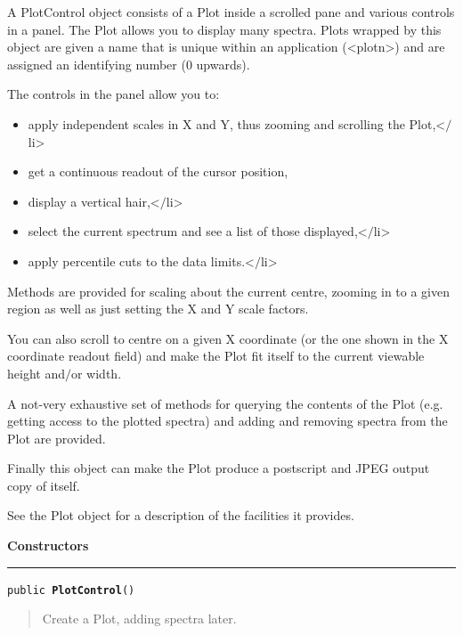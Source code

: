 \documentclass[twoside,11pt]{article}
\renewcommand{\_}{\texttt{\symbol{95}}}
\newcommand{\method}[1]{\texttt{#1}}
\newenvironment{desc}{\begin{quote}}{\end{quote}}
\newcommand{\constructors}{
   \par\textbf{\large{Constructors}}\\
   \hrule
}
\begin{document}





{A PlotControl object consists of a Plot inside a scrolled pane and
 various controls in a panel. The Plot allows you to display many
 spectra. Plots wrapped by this object are given a name that is
 unique within an application (\textless plotn\textgreater ) and are assigned an
 identifying number (0 upwards).

 The controls in the panel allow you to:
 \begin{itemize}
 \item{ apply independent scales in X and Y, thus zooming and
        scrolling the Plot,\textless $/$li\textgreater
 }
   \item{  get a continuous readout of the cursor position,
   }
\item{  display a vertical hair,\textless $/$li\textgreater
   }
\item{  select the current spectrum and see a list of those
        displayed,\textless $/$li\textgreater
   }
\item{  apply percentile cuts to the data limits.\textless $/$li\textgreater
 }
\end{itemize}

 Methods are provided for scaling about the current centre, zooming
 in to a given region as well as just setting the X and Y scale
 factors.

 You can also scroll to centre on a given X coordinate (or the one
 shown in the X coordinate readout field) and make the Plot fit
 itself to the current viewable height and$/$or width.

 A not-very exhaustive set of methods for querying the contents of
 the Plot (e.g. getting access to the plotted spectra) and adding
 and removing spectra from the Plot are provided.

 Finally this object can make the Plot produce a postscript and JPEG
 output copy of itself.

 See the Plot object for a description of the facilities it
 provides.}

\constructors
\method{public \textbf{PlotControl}()\label{l130}\label{l131}}
\begin{desc}Create a Plot, adding spectra later.
\end{desc}
\end{document}
